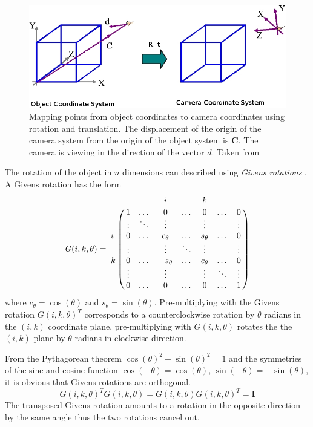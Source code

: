 \documentclass[11pt,a4paper]{report}
\begin{document}
\begin{figure}[H] 
\centering
\includegraphics[scale=0.55]{images/camera_object5.png}
\caption{ Mapping points from object coordinates to camera coordinates using
  rotation and translation. The displacement of the origin of the camera system
  from the origin of the object system is $\mathbf{C}$. The camera is viewing in
the direction of the vector $d$. Taken from \cite{graphics}}
\label{fg:objCam}
\end{figure}

The rotation of the object in $n$ dimensions can described using
\textit{Givens rotations} \cite{matrix}. A Givens rotation has the form
\begin{equation}\label{eq:givens}
\mathit{G}(i,k,\theta) = 
\bordermatrix{
&&&i&&k& \cr
&1&\dotso&0&\dotso&0&\dotso&0 \cr
&\vdots&\ddots&\vdots&&\vdots&&\vdots \cr
i&0&\dotso&c_\theta&\dotso&s_\theta&\dotso&0 \cr
&\vdots&&\vdots&\ddots&\vdots&&\vdots \cr
k&0&\dotso&-s_\theta&\dotso&c_\theta&\dotso&0 \cr
&\vdots&&\vdots&&\vdots&\ddots&\vdots \cr
&0&\dotso&0&\dotso&0&\dotso&1 \cr
}
\end{equation}
where $c_\theta = \cos(\theta)$ and $s_\theta = \sin(\theta)$. Pre-multiplying with the Givens
rotation $\mathit{G}(i,k,\theta)^T$ corresponds to a counterclockwise rotation
by $\theta$ radians in the $(i,k)$ coordinate plane, pre-multiplying with
$\mathit{G}(i,k,\theta)$ rotates the the $(i,k)$ plane by $\theta$ radians in
clockwise direction.

From the Pythagorean theorem $\cos(\theta)^2 + \sin(\theta)^2 = 1$ and the symmetries of the sine and cosine function $\cos(-\theta) =
\cos(\theta)$, $\sin(-\theta) = -\sin(\theta)$, it is obvious that Givens rotations are
orthogonal.
\begin{equation}
\mathit{G}(i,k,\theta)^T\mathit{G}(i,k,\theta) =
\mathit{G}(i,k,\theta)\mathit{G}(i,k,\theta)^T = \mathbf{I}
\end{equation}
The transposed Givens rotation amounts to a rotation in the opposite direction by
the same angle thus the two rotations cancel out.
\end{document}
